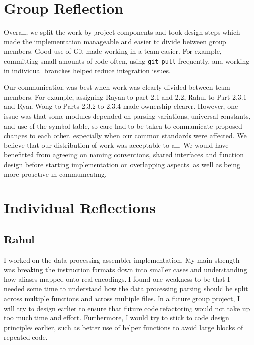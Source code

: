 \documentclass[11pt]{article}
\begin{document}
\section{Group Reflection}

Overall, we split the work by project components and took design steps which made the implementation manageable and easier to divide between group members. Good use of Git made working in a team easier. For example, committing small amounts of code often, using \texttt{git pull} frequently, and working in individual branches helped reduce integration issues.

Our communication was best when work was clearly divided between team members. For example, assigning Rayan to part 2.1 and 2.2, Rahul to Part 2.3.1 and Ryan Wong to Parts 2.3.2 to 2.3.4 made ownership clearer. However, one issue was that some modules depended on parsing variations, universal constants, and use of the symbol table, so care had to be taken to communicate proposed changes to each other, especially when our common standards were affected. We believe that our distribution of work was acceptable to all. We would have benefitted from agreeing on naming conventions, shared interfaces and function design before starting implementation on overlapping aspects, as well as being more proactive in communicating.

\section{Individual Reflections}

\subsection{Rahul}
I worked on the data processing assembler implementation. My main strength was breaking the instruction formats down into smaller cases and understanding how aliases mapped onto real encodings. I found one weakness to be that I needed some time to understand how the data processing parsing should be split across multiple functions and across multiple files. In a future group project, I will try to design earlier to ensure that future code refactoring would not take up too much time and effort. Furthermore, I would try to stick to code design principles earlier, such as better use of helper functions to avoid large blocks of repeated code.
\end{document}
